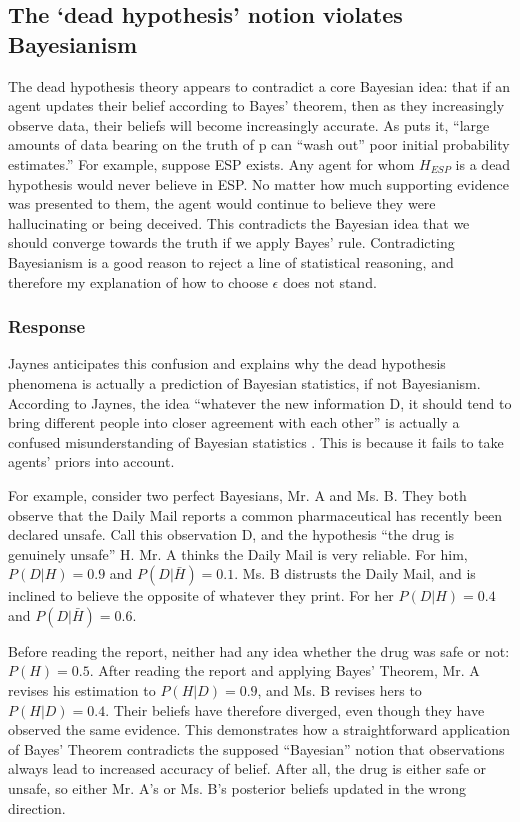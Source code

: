 \documentclass{article}
\begin{document}
\subsection{The `dead hypothesis' notion violates Bayesianism} 

The dead hypothesis theory appears to contradict a core Bayesian idea: that if an agent updates their belief according to Bayes' theorem, then as they increasingly observe data, their beliefs will become increasingly accurate. As \citep[pg. 56]{resnik1987choices} puts it, ``large amounts of data bearing on the truth of p can ``wash out'' poor initial probability estimates.'' For example, suppose ESP exists. Any agent for whom \(H_{ESP}\) is a dead hypothesis would never believe in ESP. No matter how much supporting evidence was presented to them, the agent would continue to believe they were hallucinating or being deceived. This contradicts the Bayesian idea that we should converge towards the truth if we apply Bayes' rule. Contradicting Bayesianism is a good reason to reject a line of statistical reasoning, and therefore my explanation of how to choose \(\epsilon\) does not stand.

\subsubsection*{Response}

Jaynes anticipates this confusion and explains why the dead hypothesis phenomena is actually a prediction of Bayesian statistics, if not Bayesianism. According to Jaynes, the idea ``whatever the new information D, it should tend to bring different people into closer agreement with each other'' is actually a confused misunderstanding of Bayesian statistics \citep[pg. 127]{jaynes2003probability}. This is because it fails to take agents' priors into account. 

For example, consider two perfect Bayesians, Mr. A and Ms. B. They both observe that the Daily Mail reports a common pharmaceutical has recently been declared unsafe. Call this observation D, and the hypothesis ``the drug is genuinely unsafe'' H. Mr. A thinks the Daily Mail is very reliable. For him, \(P(D|H) = 0.9\) and \(P(D|\bar{H}) = 0.1\). Ms. B distrusts the Daily Mail, and is inclined to believe the opposite of whatever they print. For her \(P(D|H) = 0.4\) and \(P(D|\bar{H}) = 0.6\).

Before reading the report, neither had any idea whether the drug was safe or not: \(P(H) = 0.5\). After reading the report and applying Bayes' Theorem, Mr. A revises his estimation to \(P(H|D) = 0.9\), and Ms. B revises hers to \(P(H|D) = 0.4\). Their beliefs have therefore diverged, even though they have observed the same evidence. This demonstrates how a straightforward application of Bayes' Theorem contradicts the supposed ``Bayesian'' notion that observations always lead to increased accuracy of belief. After all, the drug is either safe or unsafe, so either Mr. A's or Ms. B's posterior beliefs updated in the wrong direction.
\end{document}
